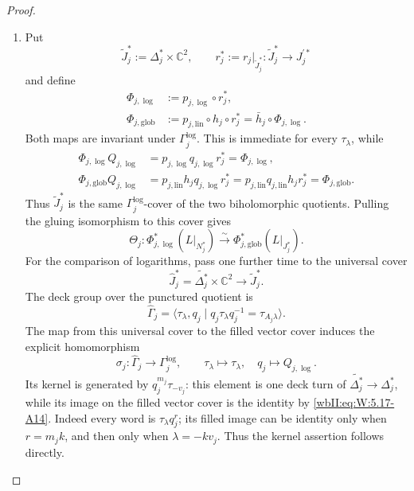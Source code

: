 \begin{proof}
\begin{enumerate}[label={$\langle1\rangle$\arabic*.},leftmargin=*]
\item Put
\[
 \widetilde J_j^*:=\Delta_j^*\times\mathbb C^2,
 \qquad
 r_j^*:=r_j|_{\widetilde J_j^*}:
 \widetilde J_j^*\longrightarrow J_j^{\prime *}
\]
and define
\[
\begin{aligned}
 \Phi_{j,\log}
  &:=p_{j,\log}\circ r_j^*,\\
 \Phi_{j,\mathrm{glob}}
  &:=p_{j,\mathrm{lin}}\circ h_j\circ r_j^*
   =\bar h_j\circ\Phi_{j,\log}.
\end{aligned}
\]
Both maps are invariant under \(\Gamma_j^{\log}\).  This is immediate for
every \(\tau_\lambda\), while
\[
\begin{aligned}
 \Phi_{j,\log}Q_{j,\log}
 &=p_{j,\log}q_{j,\log}r_j^*
  =\Phi_{j,\log},\\
 \Phi_{j,\mathrm{glob}}Q_{j,\log}
 &=p_{j,\mathrm{lin}}h_jq_{j,\log}r_j^*
  =p_{j,\mathrm{lin}}q_{j,\mathrm{lin}}h_jr_j^*
  =\Phi_{j,\mathrm{glob}}.
\end{aligned}
\]
Thus \(\widetilde J_j^*\) is the same \(\Gamma_j^{\log}\)-cover of the two
biholomorphic quotients.  Pulling the gluing isomorphism to this cover gives
\[
 \Theta_j:
 \Phi_{j,\log}^*(L|_{N_j^*})
 \xrightarrow{\ \sim\ }
 \Phi_{j,\mathrm{glob}}^*(L|_{J_j^*}).
\]
For the comparison of logarithms, pass one further time to the universal
cover
\[
 \widehat J_j^*=\widetilde{\Delta_j^*}\times\mathbb C^2
 \longrightarrow \widetilde J_j^*.
\]
The deck group over the punctured quotient is
\[
 \widehat\Gamma_j=
 \langle\tau_\lambda,q_j\mid
 q_j\tau_\lambda q_j^{-1}=\tau_{A_j\lambda}\rangle.
\]
The map from this universal cover to the filled vector cover induces the
explicit homomorphism
\[
 \sigma_j:\widehat\Gamma_j\longrightarrow\Gamma_j^{\log},
 \qquad \tau_\lambda\longmapsto\tau_\lambda,
 \quad q_j\longmapsto Q_{j,\log}.
\]
Its kernel is generated by
\(q_j^{m_j}\tau_{-v_j}\): this element is one deck turn of
\(\widetilde{\Delta_j^*}\to\Delta_j^*\), while its image on the
filled vector cover is the identity by \eqref{wbII:eq:W:5.17-A14}.
Indeed every word is \(\tau_\lambda q_j^r\); its filled image can be
identity only when \(r=m_jk\), and then only when
\(\lambda=-kv_j\).  Thus the kernel assertion follows directly.


\end{enumerate}
\end{proof}
